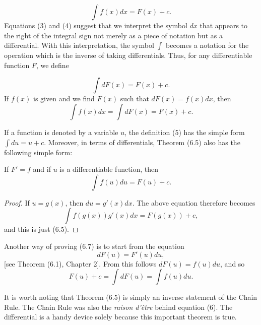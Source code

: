 \begin{equation}
\int f(x) dx = F(x) + c.  
\label{eq4.6.4}
\end{equation}
\noindent Equations (3) and (4) suggest that we interpret the symbol $dx$ that appears to the right of the integral sign not merely as a piece of notation but as a differential. With this interpretation, the symbol $\int$ becomes a notation for the operation which is the inverse of taking differentials. Thus, for any differentiable function $F$, we define

\begin{equation}
\int dF(x) = F(x) + c.   
\label{eq4.6.5}
\end{equation}
\noindent If $f(x)$ is given and we find $F(x)$ such that $dF(x) = f(x) dx$, then
$$
\int f(x) dx = \int dF(x) = F(x) + c.
$$

If a function is denoted by a variable $u$, the definition (5) has the simple form $\int du = u + c$. Moreover, in terms of differentials, Theorem (6.5) also has the following simple form:

\begin{theorem} %
If $F' = f$ and if $u$ is a differentiable function, then
$$
\int f(u) du = F(u) + c.
$$
\end{theorem}
 
\begin{proof}
If $u = g(x)$, then $du = g'(x) dx$. The above equation therefore becomes
$$
\int f(g(x))g'(x) dx = F(g(x)) + c,
$$
\noindent and this is just (6.5).
\end{proof}

Another way of proving (6.7) is to start from the equation 
\begin{equation}
dF(u) = F'(u) du,   
\label{eq4.6.6}
\end{equation}
[see Theorem (6.1), Chapter 2].
From this follows $dF(u) = f(u) du$, and so
$$
F(u) + c = \int  dF(u) = \int  f(u) du.
$$

It is worth noting that Theorem (6.5) is simply an inverse statement of the Chain Rule. The Chain Rule was also the \textit{raison d'\^{e}tre} behind equation (6). The differential is a handy device solely because this important theorem is true.

